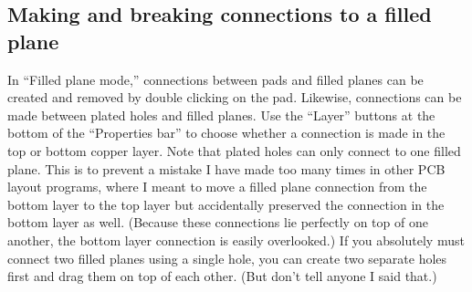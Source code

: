 \documentclass[11pt]{report}
\begin{document}
\subsection{Making and breaking connections to a filled plane}

In ``Filled plane mode,'' connections between pads and filled
planes can be created and removed by double clicking on the
pad. Likewise, connections can be made between plated holes and filled
planes. Use the ``Layer'' buttons at the bottom of the ``Properties
bar'' to choose whether a connection is made in the top or bottom
copper layer. Note that plated holes can only connect to one filled
plane. This is to prevent a mistake I have made too many times in
other PCB layout programs, where I meant to move a filled plane
connection from the bottom layer to the top layer but accidentally
preserved the connection in the bottom layer as well. (Because these
connections lie perfectly on top of one another, the bottom layer
connection is easily overlooked.) If you absolutely must connect two
filled planes using a single hole, you can create two separate holes
first and drag them on top of each other. (But don't tell anyone I
said that.)
\end{document}
